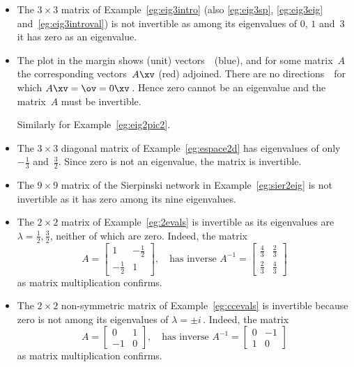 \begin{example} \label{eg:}
\begin{itemize}
\item The \(3\times 3\) matrix of Example~\ref{eg:eig3intro} (also \ref{eg:eig3sp}, \ref{eg:eig3eig} and~\ref{eg:eig3introval}) is not invertible as among its eigenvalues of \(0\), \(1\) and~\(3\) it has zero as an eigenvalue.

\item The plot in the margin shows (unit) vectors~\xv\ (blue), and for some matrix~\(A\) the corresponding vectors~\(A\xv\) (red) adjoined.
%
There are no directions~\xv\ for which \(A\xv=\ov=0\xv\)\,. 
Hence zero cannot be an eigenvalue and the matrix~\(A\) must be invertible.

Similarly for Example~\ref{eg:eig2pic2}.

\item The \(3\times3\) diagonal matrix of Example~\ref{eg:espace2d} has eigenvalues of only \(-\tfrac13\) and~\(\tfrac32\).
Since zero is not an eigenvalue, the matrix is invertible.

\item The \(9\times9\) matrix of the Sierpinski network in Example~\ref{eg:sier2eig} is not invertible as it has zero among its nine eigenvalues.

\item The \(2\times 2\) matrix of Example~\ref{eg:2evals} is invertible as its eigenvalues are \(\lambda=\frac12,\frac32\), neither of which are zero.
Indeed, the matrix
\begin{equation*}
A=\begin{bmatrix} 1&-\frac12\\-\frac12&1 \end{bmatrix},
\quad\text{has inverse }A^{-1}=\begin{bmatrix} \frac43&\frac23\\\frac23&\frac43 \end{bmatrix}
\end{equation*}
as matrix multiplication confirms.

\item The \(2\times2\) non-symmetric matrix of Example~\ref{eg:ccevals} is invertible because zero is not among its eigenvalues of \(\lambda=\pm i\)\,.
Indeed, the matrix
\begin{equation*}
A=\begin{bmatrix} 0&1\\-1&0 \end{bmatrix},
\quad\text{has inverse }A^{-1}=\begin{bmatrix} 0&-1\\1&0 \end{bmatrix}
\end{equation*}
as matrix multiplication confirms.

\end{itemize}
\end{example}



